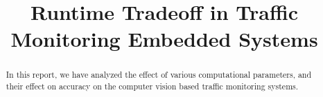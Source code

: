 \documentclass[conference]{IEEEtran}
\begin{document}
\title{Runtime Tradeoff in Traffic Monitoring Embedded Systems\\
}


\author{

}



\maketitle
\thispagestyle{plain}
\pagestyle{plain}

\begin{abstract}
In this report, we have analyzed the effect of various computational parameters, and their effect on
accuracy on the computer vision based traffic monitoring systems.
\end{abstract}

\end{document}

